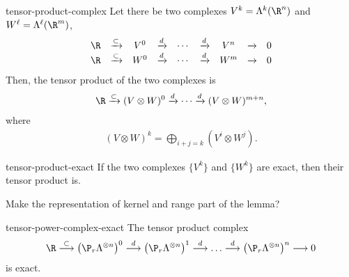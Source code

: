 \begin{Definition}{tensor-product-complex}
  Let there be two complexes $V^k = \Lambda^k(\R^n)$ and $W^\ell = \Lambda^\ell(\R^m)$,
  \begin{gather}
    \begin{matrix}
      \R&\xrightarrow{\subset}&V^0&\xrightarrow{d}&\cdots&
      \xrightarrow{d}&V^n&\xrightarrow{}& 0\\
      \R&\xrightarrow{\subset}&W^0&\xrightarrow{d}&\cdots&
      \xrightarrow{d}&W^m&\xrightarrow{}& 0
    \end{matrix}
  \end{gather}
  Then, the tensor product of the two complexes is
  \begin{gather}
    \R\xrightarrow{\subset}(V\otimes W)^0
    \xrightarrow{d}\cdots\xrightarrow{d}(V\otimes W)^{m+n},
  \end{gather}
  where
  \begin{gather}
    (V\otimes W)^k = \bigoplus_{i+j=k} (V^i\otimes W^j).
  \end{gather}
\end{Definition}

\begin{Lemma}{tensor-product-exact}
  If the two complexes $\{V^k\}$ and $\{W^k\}$ are exact, then their tensor product is.
\end{Lemma}

\begin{todo}
  Make the representation of kernel and range part of the lemma?
\end{todo}

\begin{Corollary}{tensor-power-complex-exact}
  The tensor product complex
  \begin{gather}
    \R
    \overset{\subset}{\longrightarrow}
    \left(\P_r\Lambda^{\otimes n}\right)^0
    \overset{d}{\longrightarrow}    
    \left(\P_r\Lambda^{\otimes n}\right)^1
    \overset{d}{\longrightarrow}
    \dots
    \overset{d}{\longrightarrow}    
    \left(\P_r\Lambda^{\otimes n}\right)^n
    \longrightarrow 0
  \end{gather}
  is exact.
\end{Corollary}

